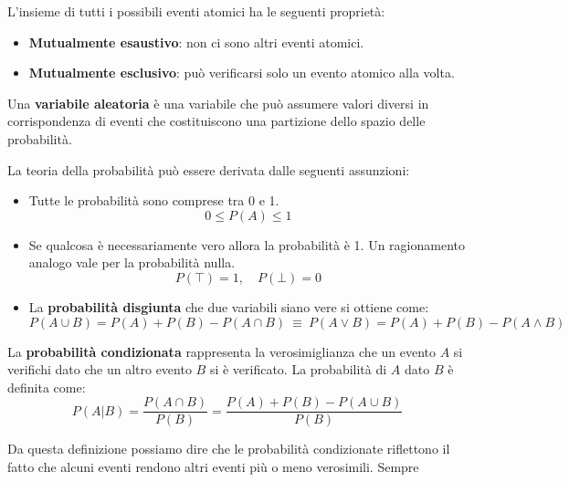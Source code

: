 L'insieme di tutti i possibili eventi atomici ha le seguenti proprietà:
\begin{itemize}
    \item \textbf{Mutualmente esaustivo}: non ci sono altri eventi atomici.
    \item \textbf{Mutualmente esclusivo}: può verificarsi solo un evento atomico
          alla volta.
\end{itemize}
\begin{definizione}
    Una \textbf{variabile aleatoria} è una variabile che può assumere valori
    diversi in corrispondenza di eventi che costituiscono una partizione dello
    spazio delle probabilità.
\end{definizione}
La teoria della probabilità può essere derivata dalle seguenti assunzioni:
\begin{itemize}
    \item Tutte le probabilità sono comprese tra 0 e 1.
          \begin{equation}
              0 \leq P(A) \leq 1
          \end{equation}
    \item Se qualcosa è necessariamente vero allora la probabilità è 1. Un
          ragionamento analogo vale per la probabilità nulla.
          \begin{equation}
              P(\top) = 1, \quad P(\bot) = 0
          \end{equation}
    \item La \textbf{probabilità disgiunta} che due variabili siano vere si ottiene come:
          \begin{equation}
              P(A \cup B) = P(A) + P(B) - P(A \cap B) \ \equiv \ P(A \lor B) = P(A) + P(B) - P(A \land B)
          \end{equation}
\end{itemize}
\begin{definizione}
    La \textbf{probabilità condizionata} rappresenta la verosimiglianza che un
    evento $A$ si verifichi dato che un altro evento $B$ si è verificato.
    La probabilità di $A$ dato $B$ è definita come:
    \begin{equation}
        P(A|B) = \frac{P(A \cap B)}{P(B)} = \frac{P(A) + P(B) - P(A \cup B)}{P(B)}
    \end{equation}
\end{definizione}
Da questa definizione possiamo dire che le probabilità condizionate riflettono
il fatto che alcuni eventi rendono altri eventi più o meno verosimili. Sempre
